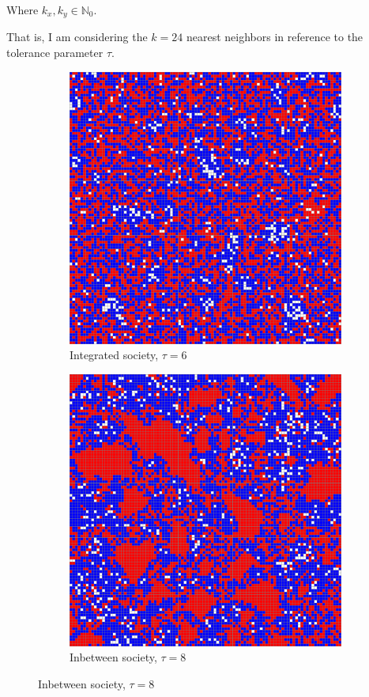 \documentclass[../main.tex]{subfiles}
\begin{document}
Where $k_x, k_y \in \mathbb{N}_0$. 


That is, I am considering the $k=24$ nearest neighbors in reference to the tolerance parameter $\tau$.

\begin{figure}[H]
\centering
\caption{Schelling model simulations by $\tau$ required same-type neighbors}
	\begin{subfigure}{0.45\textwidth}	
	\centering
    \caption{Integrated society, $\tau = 6$}
	\includegraphics[width=\textwidth]{figs/schelling_6.pdf}	
	\end{subfigure}	
	\begin{subfigure}{0.45\textwidth}	
	\centering
    \caption{Inbetween society, $\tau = 8$}
	\includegraphics[width=\textwidth]{figs/schelling_8.pdf}	

\end{subfigure}
\end{figure}
\end{document}
